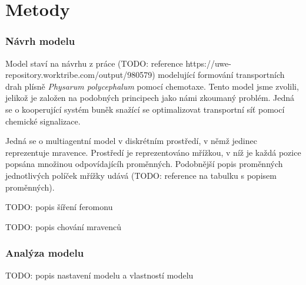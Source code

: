 \chapter*{Metody}

\subsection*{Návrh modelu}
Model staví na návrhu z práce
(TODO: reference https://uwe-repository.worktribe.com/output/980579)
modelující formování transportních drah plísně \emph{Physarum polycephalum}
pomocí chemotaxe. Tento model jsme zvolili, jelikož je založen na podobných 
principech jako námi zkoumaný problém. Jedná se o kooperující systém buněk
snažící se optimalizovat transportní síť pomocí chemické signalizace.

Jedná se o multiagentní model v diskrétním prostředí, v němž jedinec 
reprezentuje mravence. Prostředí je reprezentováno mřížkou, v níž je
každá pozice popsána množinou odpovídajícíh proměnných. Podobnější 
popis proměnných jednotlivých políček mřížky udává (TODO: reference na
tabulku s popisem proměnných).

TODO: popis šíření feromonu

TODO: popis chování mravenců


\subsection*{Analýza modelu}

TODO: popis nastavení modelu a vlastností modelu

